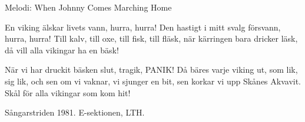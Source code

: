 \begin{song}

\begin{songmeta}
Melodi: When Johnny Comes Marching Home
\end{songmeta}

\begin{songtext}
En viking älskar livets vann,
hurra, hurra!
Den hastigt i mitt svalg försvann,
hurra, hurra!
Till kalv, till oxe, till fisk, till fläsk,
när kärringen bara dricker läsk,
då vill alla vikingar ha en bäsk!

När vi har druckit bäsken slut,
tragik, PANIK!
Då bäres varje viking ut,
som lik, sig lik,
och sen om vi vaknar, vi sjunger en bit,
sen korkar vi upp Skånes Akvavit.
Skål för alla vikingar som kom hit!
\end{songtext}

\begin{songnotes}
Sångarstriden 1981. E-sektionen, LTH.
\end{songnotes}
\end{song}

